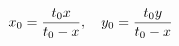 \documentclass[preview]{standalone}
\begin{document}
\begin{align*}
\special{dvisvgm:raw <g id='unique000'>}x_0=\frac{t_0x}{t_0-x},\quad y_0=\frac{t_0y}{t_0-x}\special{dvisvgm:raw </g>}
\end{align*}
\end{document}
